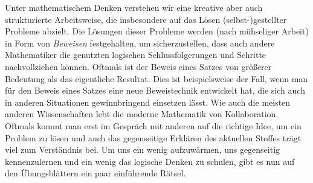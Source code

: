 Unter mathematischem Denken verstehen wir eine kreative aber auch strukturierte Arbeitsweise, die insbesondere
auf das Lösen (selbst-)gestellter Probleme abzielt. Die Lösungen dieser Probleme werden (nach mühseliger Arbeit) in Form 
von \textit{Beweisen} festgehalten, um sicherzustellen, dass auch andere Mathematiker die genutzten logischen Schlussfolgerungen und Schritte nachvollziehen können.
Oftmals ist der Beweis eines Satzes von größerer Bedeutung als das eigentliche Resultat. Dies ist beispielsweise der Fall, wenn man
für den Beweis eines Satzes eine neue Beweistechnik entwickelt hat, die sich auch in anderen Situationen gewinnbringend einsetzen lässt.
Wie auch die meisten anderen Wissenschaften lebt die moderne Mathematik von Kollaboration. Oftmals kommt man erst im Gespräch mit anderen 
auf die richtige Idee, um ein Problem zu lösen und auch das gegenseitige Erklären des aktuellen Stoffes trägt viel zum Verständnis bei.
\newline 
Um uns ein wenig aufzuwärmen, uns gegenseitig kennenzulernen und ein wenig das logische Denken zu schulen, gibt es nun auf den Übungsblättern ein paar einführende Rätsel. 
